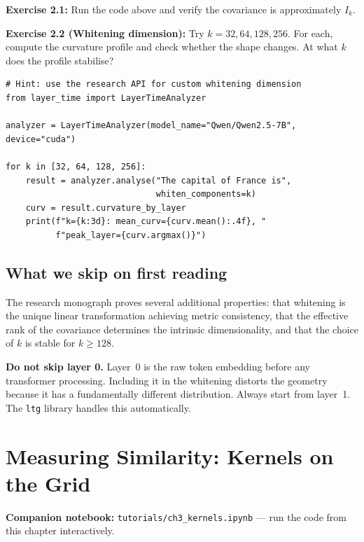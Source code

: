 \documentclass[11pt, twoside, openright]{memoir}
\newcommand{\notebook}[1]{%
  \begin{tcolorbox}[enhanced, colback=LBlue!30, colframe=Blue!60,
    left=4pt, right=4pt, top=3pt, bottom=3pt, boxrule=0.6pt, arc=2pt,
    before skip=6pt, after skip=10pt]
    {\small\sffamily\color{Navy} \textbf{Companion notebook:}
    \texttt{tutorials/#1} --- run the code from this chapter interactively.}
  \end{tcolorbox}%
}
\begin{document}
\begin{tryit}
\textbf{Exercise 2.1:} Run the code above and verify the covariance is
approximately $I_k$.

\textbf{Exercise 2.2 (Whitening dimension):} Try $k = 32, 64, 128, 256$.
For each, compute the curvature profile and check whether the shape changes.
At what $k$ does the profile stabilise?
\begin{lstlisting}
# Hint: use the research API for custom whitening dimension
from layer_time import LayerTimeAnalyzer

analyzer = LayerTimeAnalyzer(model_name="Qwen/Qwen2.5-7B", device="cuda")

for k in [32, 64, 128, 256]:
    result = analyzer.analyse("The capital of France is",
                              whiten_components=k)
    curv = result.curvature_by_layer
    print(f"k={k:3d}: mean_curv={curv.mean():.4f}, "
          f"peak_layer={curv.argmax()}")
\end{lstlisting}
\end{tryit}

\section{What we skip on first reading}

The research monograph proves several additional properties: that whitening
is the unique linear transformation achieving metric consistency, that the
effective rank of the covariance determines the intrinsic dimensionality,
and that the choice of $k$ is stable for $k \geq 128$.

\begin{pitfall}
\textbf{Do not skip layer 0.} Layer~0 is the raw token embedding before any
transformer processing. Including it in the whitening distorts the geometry
because it has a fundamentally different distribution. Always start from
layer~1. The \texttt{ltg} library handles this automatically.
\end{pitfall}


\chapter{Measuring Similarity: Kernels on the Grid}
\label{chap:kernels}

\notebook{ch3\_kernels.ipynb}
\end{document}
